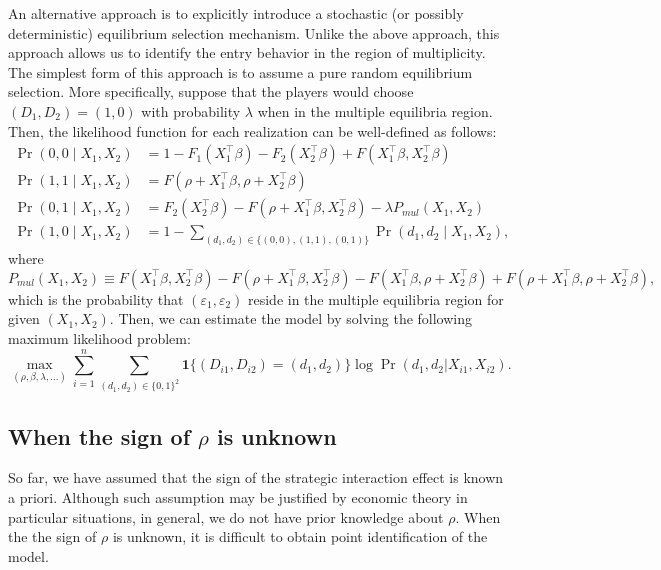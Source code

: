 \documentclass[10.5pt, A4paper, openany, uplatex]{book}
\newcommand{\mbf}{\mathbf}
\newcommand{\eps}{\varepsilon}
\numberwithin{equation}{section}
\begin{document}
An alternative approach is to explicitly introduce a stochastic (or possibly deterministic) equilibrium selection mechanism. 
Unlike the above approach, this approach allows us to identify the entry behavior in the region of multiplicity.
The simplest form of this approach is to assume a pure random equilibrium selection.
More specifically, suppose that the players would choose $(D_1, D_2) = (1,0)$ with probability $\lambda$ when in the multiple equilibria region.
Then, the likelihood function for each realization can be well-defined as follows:
\begin{align*}
	\Pr(0, 0 \mid X_1, X_2) 
	& = 1 - F_1(X_1^\top\beta) - F_2(X_2^\top\beta) + F(X_1^\top\beta, X_2^\top\beta)  \\
	\Pr(1, 1 \mid X_1, X_2) 
	& = F(\rho + X_1^\top\beta, \rho + X_2^\top\beta) \\
	\Pr(0, 1 \mid X_1, X_2) 
	& = F_2( X_2^\top\beta) - F(\rho + X_1^\top\beta, X_2^\top\beta) - \lambda P_{mul}(X_1, X_2) \\
	\Pr(1, 0 \mid X_1, X_2)
	& = 1 - \sum_{(d_1, d_2) \in \{(0,0), (1,1), (0,1)\}}\Pr( d_1, d_2 \mid X_1, X_2), 
\end{align*}
where
\[
	P_{mul}(X_1, X_2) \equiv F(X_1^\top\beta, X_2^\top\beta)  - F(\rho + X_1^\top\beta, X_2^\top\beta) - F(X_1^\top\beta, \rho + X_2^\top\beta) +   F(\rho + X_1^\top\beta, \rho + X_2^\top\beta) ,
\]
which is the probability that $(\eps_1, \eps_2)$ reside in the multiple equilibria region for given $(X_1, X_2)$.
Then, we can estimate the model by solving the following maximum likelihood problem:
\[
	\max_{(\rho, \beta, \lambda, \ldots)} \sum_{i = 1}^n \sum_{(d_1, d_2) \in \{0,1\}^2} \mbf{1}\{(D_{i1}, D_{i2}) = (d_1, d_2) \} \log \Pr( d_1, d_2 | X_{i1}, X_{i2}).
\]

\subsection{When the sign of $\rho$ is unknown}

So far, we have assumed that the sign of the strategic interaction effect is known a priori.
Although such assumption may be justified by economic theory in particular situations, in general, we do not have prior knowledge about $\rho$.
When the the sign of $\rho$ is unknown, it is difficult to obtain point identification of the model.
\end{document}
